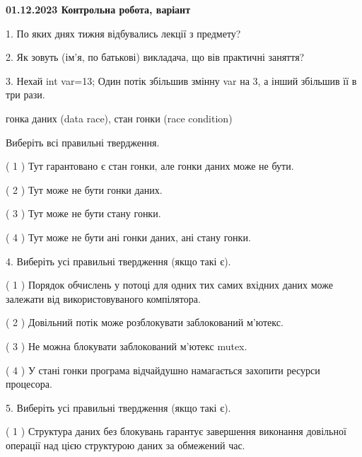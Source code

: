 \documentclass[12pt, ukrainian]{article}
\begin{document}
\vspace{4mm}
\newpage
\begin {large}

\textbf{01.12.2023 Контрольна робота, варіант  }\par


{
1. По яких днях тижня відбувались лекції з предмету?



\vspace{5mm}
2. Як зовуть (ім'я, по батькові) викладача, що вів практичні заняття?



\vspace{5mm}
3. Нехай int var=13; Один потік збільшив змінну var на 3, а інший збільшив її в три рази.

гонка даних (data race), стан гонки (race condition)

Виберіть всі правильні твердження.\par
\vspace{2mm}
( 1 ) Тут гарантовано є стан гонки, але гонки даних може не бути.%

( 2 ) Тут може не бути гонки даних.%

( 3 ) Тут може не бути стану гонки.%

( 4 ) Тут може не бути ані гонки даних, ані стану гонки.%


\vspace{5mm}
4. Виберіть усі правильні твердження (якщо такі є).\par
\vspace{2mm}

( 1 ) Порядок обчислень у потоці для одних тих самих вхідних даних може залежати від використовуваного компілятора.%

( 2 ) Довільний потік може розблокувати заблокований м’ютекс.%

( 3 ) Не можна блокувати заблокований м’ютекс mutex.%

( 4 ) У стані гонки програма відчайдушно намагається захопити ресурси процесора.%


\vspace{5mm}
5. Виберіть усі правильні твердження (якщо такі є).\par
\vspace{2mm}

( 1 ) Структура даних без блокувань гарантує завершення виконання довільної операції над цією структурою даних за обмежений час.%

}
\end{large}
\end{document}
